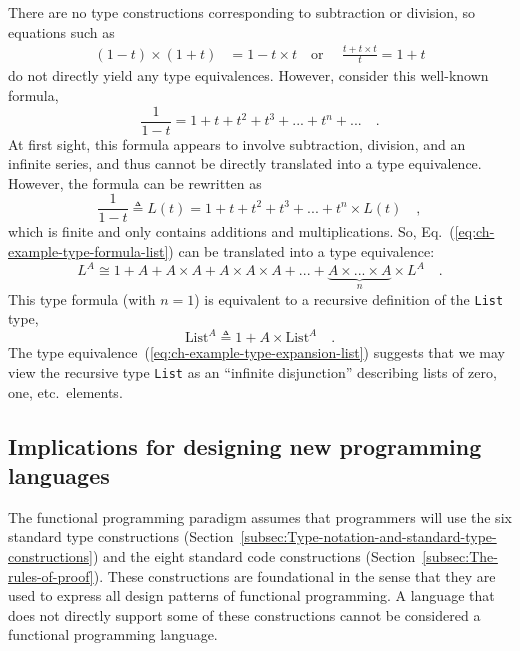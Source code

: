 There are no type constructions corresponding to subtraction or division,
so equations such as 
\begin{align*}
\left(1-t\right)\times\left(1+t\right) & =1-t\times t\quad\text{or }\quad\frac{t+t\times t}{t}=1+t
\end{align*}
do not directly yield any type equivalences. However, consider this
well-known formula,
\[
\frac{1}{1-t}=1+t+t^{2}+t^{3}+...+t^{n}+...\quad.
\]
At first sight, this formula appears to involve subtraction, division,
and an infinite series, and thus cannot be directly translated into
a type equivalence. However, the formula can be rewritten as
\begin{equation}
\frac{1}{1-t}\triangleq L(t)=1+t+t^{2}+t^{3}+...+t^{n}\times L(t)\quad,\label{eq:ch-example-type-formula-list}
\end{equation}
which is finite and only contains additions and multiplications. So,
Eq.~(\ref{eq:ch-example-type-formula-list}) can be translated into
a type equivalence:
\begin{equation}
L^{A}\cong1+A+A\times A+A\times A\times A+...+\underbrace{A\times...\times A}_{n}\times L^{A}\quad.\label{eq:ch-example-type-expansion-list}
\end{equation}
This type formula (with $n=1$) is equivalent to a recursive definition
of the \lstinline!List! type,
\[
\text{List}^{A}\triangleq1+A\times\text{List}^{A}\quad.
\]
The type equivalence~(\ref{eq:ch-example-type-expansion-list}) suggests
that we may view the recursive type \lstinline!List! as an ``infinite
disjunction'' describing lists of zero, one, etc.~elements.

\subsection{Implications for designing new programming languages}

The functional programming paradigm assumes that programmers will
use the six standard type constructions (Section~\ref{subsec:Type-notation-and-standard-type-constructions})
and the eight standard code constructions (Section~\ref{subsec:The-rules-of-proof}).
These constructions are foundational in the sense that they are used
to express all design patterns of functional programming. A language
that does not directly support some of these constructions cannot
be considered a functional programming language.

